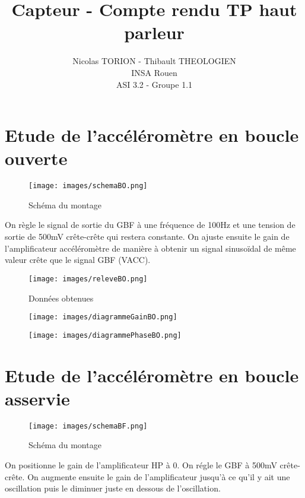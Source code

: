 \documentclass[a4paper,12pt]{article}
\title{Capteur - Compte rendu TP haut parleur}
\author{
	Nicolas TORION - Thibault THEOLOGIEN\\
	INSA Rouen\\
	ASI 3.2 - Groupe 1.1
}
\begin{document}
	\maketitle
	\tableofcontents
	\newpage

	\section{Etude de l'accéléromètre en boucle ouverte}
	\label{sec:Etude de l'accéléromètre en boucle ouverte}
		\begin{figure}[!h]
			\caption{Schéma du montage}
			\centering
			\texttt{[image: images/schemaBO.png]}
		\end{figure}

		\par On règle le signal de sortie du GBF à une fréquence de 100Hz et une tension de sortie de 500mV crête-crête qui restera constante.
		On ajuste ensuite le gain de l’amplificateur accéléromètre de manière à obtenir un signal sinusoïdal de même valeur crête que le signal GBF (VACC).

		\begin{figure}[!h]
			\caption{Données obtenues}
			\centering
			\texttt{[image: images/releveBO.png]}
		\end{figure}

		\begin{figure}[!h]
			\caption{}
			\centering
			\texttt{[image: images/diagrammeGainBO.png]}
		\end{figure}

		\begin{figure}[!h]
			\caption{}
			\centering
			\texttt{[image: images/diagrammePhaseBO.png]}
		\end{figure}

	\pagebreak

	\section{Etude de l'accéléromètre en boucle asservie}
	\label{sec:Etude de l'accéléromètre en boucle asservie}
		\begin{figure}[!h]
			\caption{Schéma du montage}
			\centering
			\texttt{[image: images/schemaBF.png]}
		\end{figure}

		\par On positionne le gain de l’amplificateur HP à 0.
		On régle le GBF à 500mV crête-crête.
		On augmente ensuite le gain de l’amplificateur jusqu’à ce qu’il y ait une oscillation puis le diminuer juste en dessous de l’oscillation.
\end{document}
